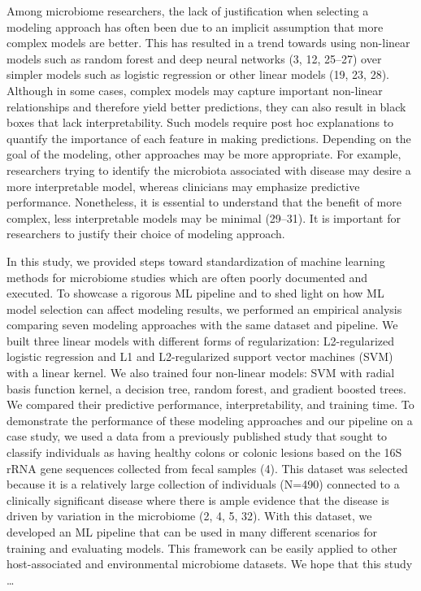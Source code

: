 \documentclass[11pt,]{article}
\begin{document}
Among microbiome researchers, the lack of justification when selecting a
modeling approach has often been due to an implicit assumption that more
complex models are better. This has resulted in a trend towards using
non-linear models such as random forest and deep neural networks (3, 12,
25--27) over simpler models such as logistic regression or other linear
models (19, 23, 28). Although in some cases, complex models may capture
important non-linear relationships and therefore yield better
predictions, they can also result in black boxes that lack
interpretability. Such models require post hoc explanations to quantify
the importance of each feature in making predictions. Depending on the
goal of the modeling, other approaches may be more appropriate. For
example, researchers trying to identify the microbiota associated with
disease may desire a more interpretable model, whereas clinicians may
emphasize predictive performance. Nonetheless, it is essential to
understand that the benefit of more complex, less interpretable models
may be minimal (29--31). It is important for researchers to justify
their choice of modeling approach.

In this study, we provided steps toward standardization of machine
learning methods for microbiome studies which are often poorly
documented and executed. To showcase a rigorous ML pipeline and to shed
light on how ML model selection can affect modeling results, we
performed an empirical analysis comparing seven modeling approaches with
the same dataset and pipeline. We built three linear models with
different forms of regularization: L2-regularized logistic regression
and L1 and L2-regularized support vector machines (SVM) with a linear
kernel. We also trained four non-linear models: SVM with radial basis
function kernel, a decision tree, random forest, and gradient boosted
trees. We compared their predictive performance, interpretability, and
training time. To demonstrate the performance of these modeling
approaches and our pipeline on a case study, we used a data from a
previously published study that sought to classify individuals as having
healthy colons or colonic lesions based on the 16S rRNA gene sequences
collected from fecal samples (4). This dataset was selected because it
is a relatively large collection of individuals (N=490) connected to a
clinically significant disease where there is ample evidence that the
disease is driven by variation in the microbiome (2, 4, 5, 32). With
this dataset, we developed an ML pipeline that can be used in many
different scenarios for training and evaluating models. This framework
can be easily applied to other host-associated and environmental
microbiome datasets. We hope that this study \ldots{}
\end{document}
